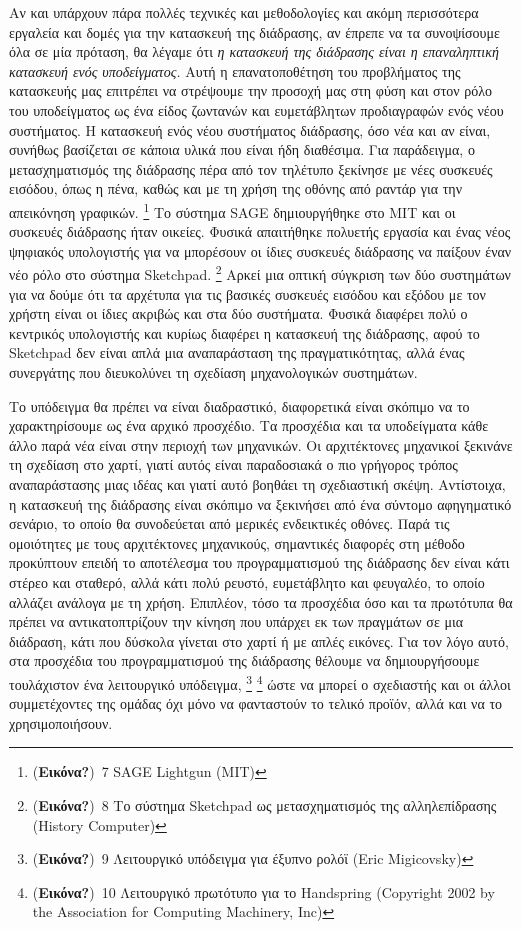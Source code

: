 \documentclass[
]{article}
\begin{document}
Αν και υπάρχουν πάρα πολλές τεχνικές και μεθοδολογίες και ακόμη
περισσότερα εργαλεία και δομές για την κατασκευή της διάδρασης, αν
έπρεπε να τα συνοψίσουμε όλα σε μία πρόταση, θα λέγαμε ότι \emph{η
κατασκευή της διάδρασης είναι η επαναληπτική κατασκευή ενός
υποδείγματος.} Αυτή η επανατοποθέτηση του προβλήματος της κατασκευής μας
επιτρέπει να στρέψουμε την προσοχή μας στη φύση και στον ρόλο του
υποδείγματος ως ένα είδος ζωντανών και ευμετάβλητων προδιαγραφών ενός
νέου συστήματος. Η κατασκευή ενός νέου συστήματος διάδρασης, όσο νέα και
αν είναι, συνήθως βασίζεται σε κάποια υλικά που είναι ήδη διαθέσιμα. Για
παράδειγμα, ο μετασχηματισμός της διάδρασης πέρα από τον τηλέτυπο
ξεκίνησε με νέες συσκευές εισόδου, όπως η πένα, καθώς και με τη χρήση
της οθόνης από ραντάρ για την απεικόνηση γραφικών. \footnote{(\textbf{Εικόνα?})~7
  SAGE Lightgun (MIT)} Το σύστημα SAGE δημιουργήθηκε στο MIT και οι
συσκευές διάδρασης ήταν οικείες. Φυσικά απαιτήθηκε πολυετής εργασία και
ένας νέος ψηφιακός υπολογιστής για να μπορέσουν οι ίδιες συσκευές
διάδρασης να παίξουν έναν νέο ρόλο στο σύστημα Sketchpad. \footnote{(\textbf{Εικόνα?})~8
  Το σύστημα Sketchpad ως μετασχηματισμός της αλληλεπίδρασης (History
  Computer)} Αρκεί μια οπτική σύγκριση των δύο συστημάτων για να δούμε
ότι τα αρχέτυπα για τις βασικές συσκευές εισόδου και εξόδου με τον
χρήστη είναι οι ίδιες ακριβώς και στα δύο συστήματα. Φυσικά διαφέρει
πολύ ο κεντρικός υπολογιστής και κυρίως διαφέρει η κατασκευή της
διάδρασης, αφού το Sketchpad δεν είναι απλά μια αναπαράσταση της
πραγματικότητας, αλλά ένας συνεργάτης που διευκολύνει τη σχεδίαση
μηχανολογικών συστημάτων.

Το υπόδειγμα θα πρέπει να είναι διαδραστικό, διαφορετικά είναι σκόπιμο
να το χαρακτηρίσουμε ως ένα αρχικό προσχέδιο. Τα προσχέδια και τα
υποδείγματα κάθε άλλο παρά νέα είναι στην περιοχή των μηχανικών. Οι
αρχιτέκτονες μηχανικοί ξεκινάνε τη σχεδίαση στο χαρτί, γιατί αυτός είναι
παραδοσιακά ο πιο γρήγορος τρόπος αναπαράστασης μιας ιδέας και γιατί
αυτό βοηθάει τη σχεδιαστική σκέψη. Αντίστοιχα, η κατασκευή της διάδρασης
είναι σκόπιμο να ξεκινήσει από ένα σύντομο αφηγηματικό σενάριο, το οποίο
θα συνοδεύεται από μερικές ενδεικτικές οθόνες. Παρά τις ομοιότητες με
τους αρχιτέκτονες μηχανικούς, σημαντικές διαφορές στη μέθοδο προκύπτουν
επειδή το αποτέλεσμα του προγραμματισμού της διάδρασης δεν είναι κάτι
στέρεο και σταθερό, αλλά κάτι πολύ ρευστό, ευμετάβλητο και φευγαλέο, το
οποίο αλλάζει ανάλογα με τη χρήση. Επιπλέον, τόσο τα προσχέδια όσο και
τα πρωτότυπα θα πρέπει να αντικατοπτρίζουν την κίνηση που υπάρχει εκ των
πραγμάτων σε μια διάδραση, κάτι που δύσκολα γίνεται στο χαρτί ή με απλές
εικόνες. Για τον λόγο αυτό, στα προσχέδια του προγραμματισμού της
διάδρασης θέλουμε να δημιουργήσουμε τουλάχιστον ένα λειτουργικό
υπόδειγμα, \footnote{(\textbf{Εικόνα?})~9 Λειτουργικό υπόδειγμα για
  έξυπνο ρολόϊ (Eric Migicovsky)} \footnote{(\textbf{Εικόνα?})~10
  Λειτουργικό πρωτότυπο για το Handspring (Copyright 2002 by the
  Association for Computing Machinery, Inc)} ώστε να μπορεί ο σχεδιαστής
και οι άλλοι συμμετέχοντες της ομάδας όχι μόνο να φανταστούν το τελικό
προϊόν, αλλά και να το χρησιμοποιήσουν.
\end{document}
